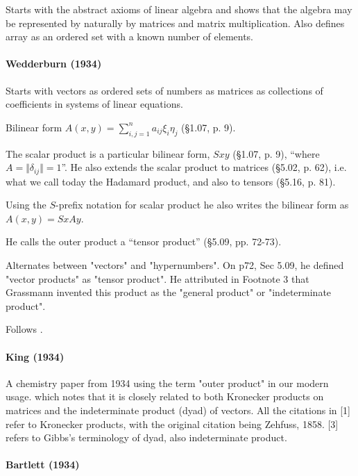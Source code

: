 Starts with the abstract axioms of linear algebra and shows that the algebra may be represented by naturally by matrices and matrix multiplication. Also defines array as an ordered set with a known number of elements.

\paragraph{Wedderburn (1934)~\cite{Wedderburn1934}}

Starts with vectors as ordered sets of numbers as matrices as collections of coefficients in systems of linear equations.

Bilinear form $A(x, y) = \sum^n_{i,j=1} a_{ij} \xi_i \eta_j $ (\S 1.07, p. 9).

The scalar product is a particular bilinear form, $S x y$ (\S 1.07, p. 9), ``where $A = \Vert \delta_{ij} \Vert = 1$''. He also extends the scalar product to matrices (\S 5.02, p. 62), i.e. what we call today the Hadamard product, and also to tensors (\S 5.16, p. 81).

Using the $S$-prefix notation for scalar product he also writes the bilinear form as $A(x, y) = SxAy$.

He calls the outer product a ``tensor product'' (\S 5.09, pp. 72-73).

Alternates between "vectors"
and "hypernumbers". On p72, Sec 5.09, he defined "vector products" as
"tensor product". He attributed in Footnote 3 that Grassmann invented
this product as the "general product" or "indeterminate product".

Follows \cite{Scheffers1889}.



\paragraph{King (1934)}

A chemistry paper from 1934 using the term "outer product" in
our modern usage. which notes that it is closely related to both Kronecker products on
matrices and the indeterminate product (dyad) of vectors. All the
citations in [1] refer to Kronecker products, with the original
citation being Zehfuss, 1858. [3] refers to Gibbs's terminology of
dyad, also indeterminate product.



\paragraph{Bartlett (1934)}

